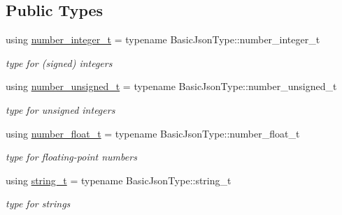 \subsection*{Public Types}
\begin{DoxyCompactItemize}
\item 
using \hyperlink{structnlohmann_1_1json__sax_a0cef30121f02b7fee85e9708148ea0aa}{number\+\_\+integer\+\_\+t} = typename Basic\+Json\+Type\+::number\+\_\+integer\+\_\+t
\begin{DoxyCompactList}\small\item\em type for (signed) integers \end{DoxyCompactList}\item 
using \hyperlink{structnlohmann_1_1json__sax_a32028cc056ae0f43aaae331cdbbbf856}{number\+\_\+unsigned\+\_\+t} = typename Basic\+Json\+Type\+::number\+\_\+unsigned\+\_\+t
\begin{DoxyCompactList}\small\item\em type for unsigned integers \end{DoxyCompactList}\item 
using \hyperlink{structnlohmann_1_1json__sax_a390c209bffd8c4800c8f3076dc465a20}{number\+\_\+float\+\_\+t} = typename Basic\+Json\+Type\+::number\+\_\+float\+\_\+t
\begin{DoxyCompactList}\small\item\em type for floating-\/point numbers \end{DoxyCompactList}\item 
using \hyperlink{structnlohmann_1_1json__sax_ae01977a9f3c5b3667b7a2929ed91061e}{string\+\_\+t} = typename Basic\+Json\+Type\+::string\+\_\+t
\begin{DoxyCompactList}\small\item\em type for strings \end{DoxyCompactList}\end{DoxyCompactItemize}
